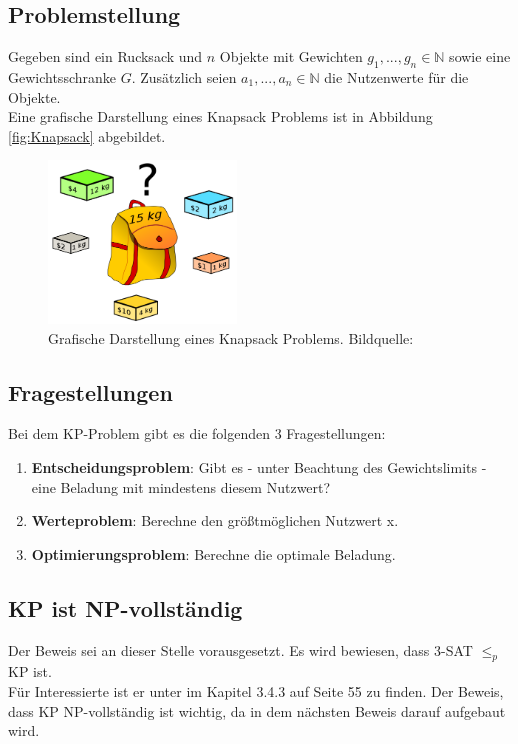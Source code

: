 \documentclass[ngerman]{article}
\begin{document}
\subsection{Problemstellung}
Gegeben sind ein Rucksack und \(n\) Objekte mit Gewichten \(g_1,...,g_n \in \mathbb{N}\) sowie eine Gewichtsschranke $G$.
Zusätzlich seien \(a_1,...,a_n \in \mathbb{N}\) die Nutzenwerte für die Objekte.\\
Eine grafische Darstellung eines Knapsack Problems ist in Abbildung \vref{fig:Knapsack} abgebildet.

\begin{figure}[H]
	\centering
	\includegraphics[width=5cm]{figures/knapsack.png}
	\caption[Grafische Darstellung eines Knapsack Problems]{Grafische Darstellung eines Knapsack Problems. Bildquelle: \cite{knapSackImage1}}
	\label{fig:Knapsacks}
\end{figure}

\subsection{Fragestellungen}
Bei dem KP-Problem gibt es die folgenden 3 Fragestellungen:
\begin{enumerate}
\item \textbf{Entscheidungsproblem}: Gibt es - unter Beachtung des Gewichtslimits - eine Beladung mit mindestens diesem Nutzwert?\\
\item \textbf{Werteproblem}: Berechne den größtmöglichen Nutzwert x.\\
\item \textbf{Optimierungsproblem}: Berechne die optimale Beladung.\\
\end{enumerate}

\subsection{KP ist NP-vollständig}
\label{sec:BeweisKP}
Der Beweis sei an dieser Stelle vorausgesetzt.
Es wird bewiesen, dass 3-SAT \(\le_p\) KP ist.\\
Für Interessierte ist er unter \cite{wegener} im Kapitel 3.4.3 auf Seite 55 zu finden.
Der Beweis, dass KP NP-vollständig ist wichtig, da in dem nächsten Beweis darauf aufgebaut wird.
\end{document}
